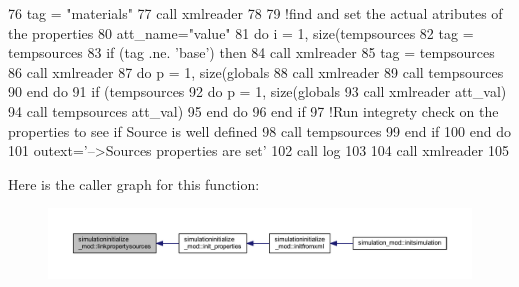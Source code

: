 \begin{DoxyCode}
76     tag = \textcolor{stringliteral}{"materials"}
77     \textcolor{keyword}{call }xmlreader%
78 
79     \textcolor{comment}{!find and set the actual atributes of the properties}
80     att\_name=\textcolor{stringliteral}{"value"}
81     \textcolor{keywordflow}{do} i = 1, \textcolor{keyword}{size}(tempsources%
82         tag = tempsources%
83         \textcolor{keywordflow}{if} (tag .ne. \textcolor{stringliteral}{'base'}) \textcolor{keywordflow}{then}
84             \textcolor{keyword}{call }xmlreader%
85             tag = tempsources%
86             \textcolor{keyword}{call }xmlreader%
87             \textcolor{keywordflow}{do} p = 1, \textcolor{keyword}{size}(globals%
88                 \textcolor{keyword}{call }xmlreader%
89                 \textcolor{keyword}{call }tempsources%
90 \textcolor{keywordflow}{            end do}
91             \textcolor{keywordflow}{if} (tempsources%
92                 \textcolor{keywordflow}{do} p = 1, \textcolor{keyword}{size}(globals%
93                     \textcolor{keyword}{call }xmlreader%
      att\_val)
94                     \textcolor{keyword}{call }tempsources%
      att\_val)
95 \textcolor{keywordflow}{                end do}
96 \textcolor{keywordflow}{            end if}
97             \textcolor{comment}{!Run integrety check on the properties to see if Source is well defined}
98             \textcolor{keyword}{call }tempsources%
99 \textcolor{keywordflow}{        end if}
100 \textcolor{keywordflow}{    end do}
101     outext=\textcolor{stringliteral}{'-->Sources properties are set'}
102     \textcolor{keyword}{call }log%
103 
104     \textcolor{keyword}{call }xmlreader%
105 
\end{DoxyCode}
Here is the caller graph for this function\+:\nopagebreak
\begin{figure}[H]
\begin{center}
\leavevmode
\includegraphics[width=350pt]{namespacesimulationinitialize__mod_aa4c1099b84c9901ab1286a3796a54f71_icgraph}
\end{center}
\end{figure}

